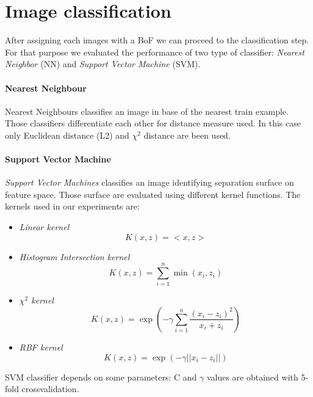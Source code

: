 \section{Image classification}

After assigning each images with a BoF we can proceed to the classification step. For that purpose we evaluated the performance of two type of classifier: \emph{Nearest Neighbor} (NN) and \emph{Support Vector Machine} (SVM).

\paragraph{Nearest Neighbour}

Nearest Neighbours classifies an image in base of the nearest train example. Those classifiers differentiate each other for distance measure used. In this case only Euclidean distance (L2) and $\chi^2$ distance are been used.

\paragraph{Support Vector Machine}

\emph{Support Vector Machines} classifies an image identifying separation surface on feature space. Those surface are evaluated using different kernel functions. The kernels used in our experiments are:
\begin{itemize}
\item \emph{Linear kernel}
\begin{equation}
K(x, z) = <x, z>
\end{equation}
\item \emph{Histogram Intersection kernel}
\begin{equation}
K(x, z) = \sum_{i = 1}^{n} \min (x_i, z_i)
\end{equation}
\item \emph{$\chi^2$ kernel}
\begin{equation}
K(x, z) = \exp (-\gamma \sum_{i = 1}^{n} \frac{(x_i - z_i)^2}{x_i + z_i})
\end{equation}
\item \emph{RBF kernel}
\begin{equation}
K(x, z) = \exp (- \gamma ||x_i - z_i||)
\end{equation}
\end{itemize}
SVM classifier depends on some parameters: C and $\gamma$ values are obtained with 5-fold crossvalidation.